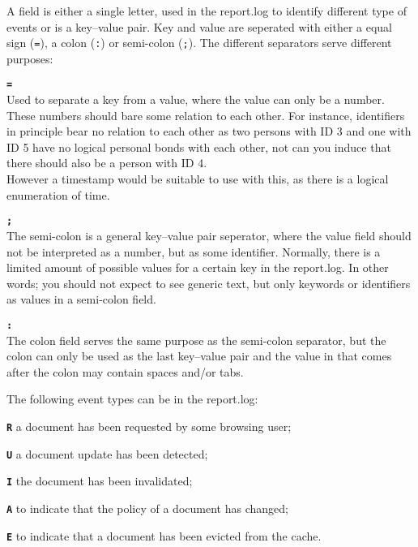 \documentclass[10pt,a4paper]{article}
\makeatletter
\newenvironment{p}{\@open{P}{}}{\@close{P}}
\newenvironment{p}{}{\par}
\makeatother
\begin{document}
\begin{p}
A field is either a single letter, used in the report.log to identify
different type of events or is a key--value pair.  Key and value are seperated
with either a equal sign (\verb!=!), a colon (\verb!:!) or semi-colon
(\verb!;!).  The different separators serve different purposes:
\begin{description}
\item{\textbf{\texttt{=}}} \\
  Used to separate a key from a value, where the value can only be a number.
  These numbers should bare some relation to each other.  For instance,
  identifiers in principle bear no relation to each other as two persons with
  ID 3 and one with ID 5 have no logical personal bonds with each other, not
  can you induce that there should also be a person with ID 4. \\
  However a timestamp would be suitable to use with this, as there is a
  logical enumeration of time.
\item{\textbf{\texttt{;}}} \\
  The semi-colon is a general key--value pair seperator, where the value field
  should not be interpreted as a number, but as some identifier.  Normally,
  there is a limited amount of possible values for a certain key in the
  report.log.  In other words; you should not expect to see generic text, but
  only keywords or identifiers as values in a semi-colon field.
\item{\textbf{\texttt{:}}} \\
  The colon field serves the same purpose as the semi-colon separator, but the
  colon can only be used as the last key--value pair and the value in
  that comes after the colon may contain spaces and/or tabs.
\end{description}
\end{p}

\begin{p}
The following event types can be in the report.log:
\begin{description}
\item{\textbf{\texttt{R}}} a document has been requested by some browsing user;
\item{\textbf{\texttt{U}}} a document update has been detected;
\item{\textbf{\texttt{I}}} the document has been invalidated;
\item{\textbf{\texttt{A}}} to indicate that the policy of a document has
  changed;
\item{\textbf{\texttt{E}}} to indicate that a document has been evicted from
  the cache.
\end{description}
\end{p}
\end{document}
